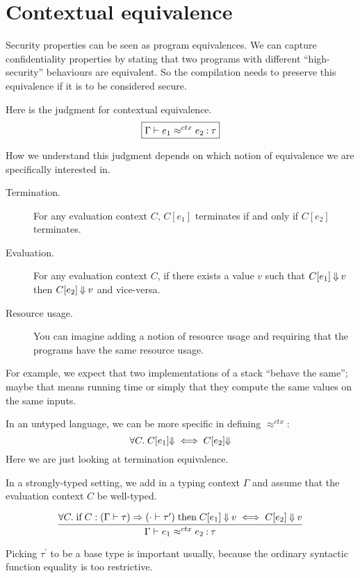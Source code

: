 \documentclass[11pt]{article}
\newcommand{\ctxeq}{\approx^{ctx}}
\begin{document}
\section{Contextual equivalence}

Security properties can be seen as program equivalences. We can capture
confidentiality properties by stating that two programs with different
``high-security'' behaviours are equivalent. So the compilation needs to
preserve this equivalence if it is to be considered secure.

Here is the judgment for contextual equivalence.
\[
\boxed{%
  \Gamma
  \proves e_1
  \ctxeq e_2
  \oft
  \tau
}
\]

How we understand this judgment depends on which notion of equivalence we are
specifically interested in.

\begin{description}
\item[Termination.]
  For any evaluation context $C$, $C[e_1]$ terminates if and only if $C[e_2]$
  terminates.
\item[Evaluation.]
  For any evaluation context $C$, if there exists a value $v$ such that
  $C[e_1] \mathbin{\Downarrow} v$ then $C[e_2] \mathbin{\Downarrow} v$ and vice-versa.
\item[Resource usage.]
  You can imagine adding a notion of resource usage and requiring that the
  programs have the same resource usage.
\end{description}

For example, we expect that two implementations of a stack ``behave the same'';
maybe that means running time or simply that they compute the same values on the
same inputs.

In an untyped language, we can be more specific in defining $\ctxeq$:
\[
\forall C.\; C[e_1] \mathbin{\Downarrow} \iff C[e_2] \mathbin{\Downarrow}
\]
Here we are just looking at termination equivalence.

In a strongly-typed setting, we add in a typing context $\Gamma$ and assume that
the evaluation context $C$ be well-typed.

\[
\infer{%
  \Gamma \proves e_1 \ctxeq e_2 \oft \tau
}{%
  \forall C.\;
  \text{if}\;
  C : (\Gamma \proves \tau) \Rightarrow (\cdot \proves \tau^\prime) \;
  \text{then}\;
  C[e_1] \bigstep v \iff C[e_2] \bigstep v
}
\]

Picking $\tau^\prime$ to be a base type is important usually, because the
ordinary syntactic function equality is too restrictive.
\end{document}
